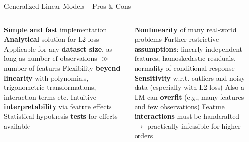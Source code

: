 
\begin{frame}{Generalized Linear Models -- Pros \& Cons}



\begin{columns}[onlytextwidth]
  \begin{column}{0.5\textwidth}
    
    \begin{procon}
      \setlength{\itemsep}{1pt}
      \setlength{\parskip}{1pt}
      \positem \textbf{Simple and fast} implementation
      \positem \textbf{Analytical} solution for L2 loss
      \positem Applicable for any \textbf{dataset size}, as long as number of 
      observations $\gg$ number of features
      \positem Flexibility \textbf{beyond linearity} with polynomials, 
      trigonometric transformations, interaction terms etc.
      \positem Intuitive \textbf{interpretability} via feature effects
      \positem Statistical hypothesis \textbf{tests} for effects available
    \end{procon}
  \end{column}

  \begin{column}{0.5\textwidth}
    
    \begin{itemize}
      \negitem \textbf{Nonlinearity} of many real-world problems
      \negitem Further restrictive \textbf{assumptions}: linearly independent 
      features, homoskedastic residuals, normality of conditional response 
      \negitem \textbf{Sensitivity} w.r.t. outliers and noisy data (especially 
      with L2 loss)
      \negitem Also a LM can \textbf{overfit} (e.g., many features and few observations) 
      \negitem Feature \textbf{interactions} must be handcrafted\\
      $\rightarrow$ practically infeasible for higher orders
    \end{itemize}
  \end{column}
\end{columns}

\end{frame}